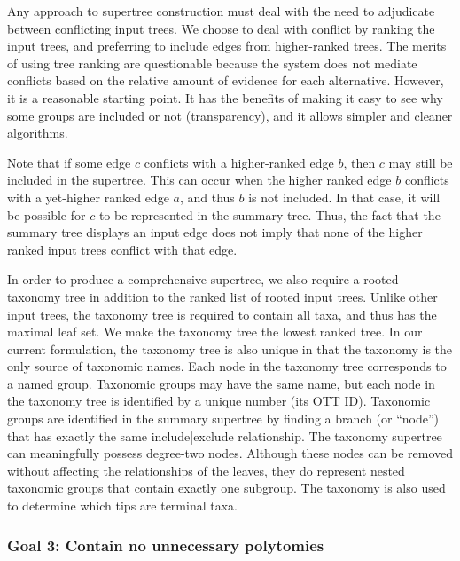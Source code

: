 \documentclass[fleqn,12pt,lineno,english]{wlpeerj}
\begin{document}
Any approach to supertree construction must deal with the need to
adjudicate between conflicting input trees. We choose to deal with
conflict by ranking the input trees, and preferring to include edges
from higher-ranked trees. The merits of using tree ranking are questionable
because the system does not mediate conflicts based on the relative
amount of evidence for each alternative. However, it is a reasonable
starting point. It has the benefits of making it easy to see why some
groups are included or not (transparency), and it allows simpler and
cleaner algorithms.

Note that if some edge $c$ conflicts with a higher-ranked edge $b$,
then $c$ may still be included in the supertree. This can occur when
the higher ranked edge $b$ conflicts with a yet-higher ranked edge
$a$, and thus $b$ is not included. In that case, it will be possible
for $c$ to be represented in the summary tree. Thus, the fact that
the summary tree displays an input edge does not imply that none of
the higher ranked input trees conflict with that edge. 

In order to produce a comprehensive supertree, we also require a rooted
taxonomy tree in addition to the ranked list of rooted input trees.
Unlike other input trees, the taxonomy tree is required to contain
all taxa, and thus has the maximal leaf set. We make the taxonomy
tree the lowest ranked tree. In our current formulation, the taxonomy
tree is also unique in that the taxonomy is the only source of taxonomic
names. Each node in the taxonomy tree corresponds to a named group.
Taxonomic groups may have the same name, but each node in the taxonomy
tree is identified by a unique number (its OTT ID). Taxonomic groups
are identified in the summary supertree by finding a branch (or ``node'')
that has exactly the same include|exclude relationship. The taxonomy
supertree can meaningfully possess degree-two nodes. Although these
nodes can be removed without affecting the relationships of the leaves,
they do represent nested taxonomic groups that contain exactly one
subgroup. The taxonomy is also used to determine which tips are terminal
taxa.

\subsubsection{Goal 3: Contain no unnecessary polytomies}
\end{document}
